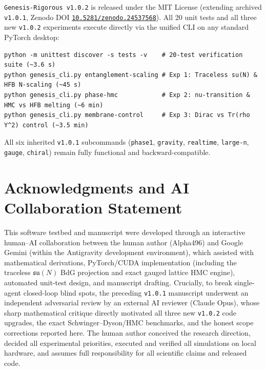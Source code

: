 \documentclass[11pt,a4paper]{article}
\begin{document}
\texttt{Genesis-Rigorous v1.0.2} is released under the MIT License (extending archived \texttt{v1.0.1}, Zenodo DOI \href{https://doi.org/10.5281/zenodo.24537568}{\texttt{10.5281/zenodo.24537568}}). All 20 unit tests and all three new \texttt{v1.0.2} experiments execute directly via the unified CLI on any standard PyTorch desktop:
\begin{verbatim}
python -m unittest discover -s tests -v    # 20-test verification suite (~3.6 s)
python genesis_cli.py entanglement-scaling # Exp 1: Traceless su(N) & HFB N-scaling (~45 s)
python genesis_cli.py phase-hmc            # Exp 2: nu-transition & HMC vs HFB melting (~6 min)
python genesis_cli.py membrane-control     # Exp 3: Dirac vs Tr(rho Y^2) control (~3.5 min)
\end{verbatim}
All six inherited \texttt{v1.0.1} subcommands (\texttt{phase1}, \texttt{gravity}, \texttt{realtime}, \texttt{large-n}, \texttt{gauge}, \texttt{chiral}) remain fully functional and backward-compatible.

\section*{Acknowledgments and AI Collaboration Statement}

This software testbed and manuscript were developed through an interactive human--AI collaboration between the human author (Alpha496) and Google Gemini (within the Antigravity development environment), which assisted with mathematical derivations, PyTorch/CUDA implementation (including the traceless $\mathfrak{su}(N)$ BdG projection and exact gauged lattice HMC engine), automated unit-test design, and manuscript drafting. Crucially, to break single-agent closed-loop blind spots, the preceding \texttt{v1.0.1} manuscript underwent an independent adversarial review by an external AI reviewer (Claude Opus), whose sharp mathematical critique directly motivated all three new \texttt{v1.0.2} code upgrades, the exact Schwinger--Dyson/HMC benchmarks, and the honest scope corrections reported here. The human author conceived the research direction, decided all experimental priorities, executed and verified all simulations on local hardware, and assumes full responsibility for all scientific claims and released code.



\end{document}
